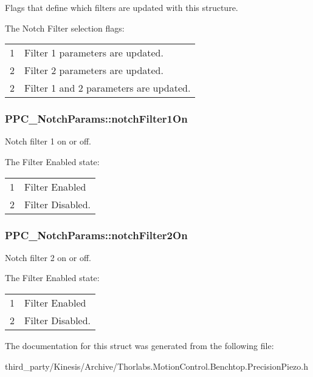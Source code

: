 Flags that define which filters are updated with this structure. 

The Notch Filter selection flags\+: \tabulinesep=1mm
\begin{longtabu} spread 0pt [c]{*2{|X[-1]}|}
&Filter 1 parameters are updated. \\
2&Filter 2 parameters are updated. \\
2&Filter 1 and 2 parameters are updated. \\
\end{longtabu}
\subsubsection[{\texorpdfstring{notch\+Filter1\+On}{notchFilter1On}}]{ P\+P\+C\+\_\+\+Notch\+Params\+::notch\+Filter1\+On}\hypertarget{struct_p_p_c___notch_params_a5f3d080db2c5af2d543e39fc33f1220d}{}\label{struct_p_p_c___notch_params_a5f3d080db2c5af2d543e39fc33f1220d}


Notch filter 1 on or off. 

The Filter Enabled state\+: \tabulinesep=1mm
\begin{longtabu} spread 0pt [c]{*2{|X[-1]}|}
&Filter Enabled \\
2&Filter Disabled. \\
\end{longtabu}
\subsubsection[{\texorpdfstring{notch\+Filter2\+On}{notchFilter2On}}]{ P\+P\+C\+\_\+\+Notch\+Params\+::notch\+Filter2\+On}\hypertarget{struct_p_p_c___notch_params_a6d5d54992092f9013ec109fb99416a91}{}\label{struct_p_p_c___notch_params_a6d5d54992092f9013ec109fb99416a91}


Notch filter 2 on or off. 

The Filter Enabled state\+: \tabulinesep=1mm
\begin{longtabu} spread 0pt [c]{*2{|X[-1]}|}
&Filter Enabled \\
2&Filter Disabled. \\
\end{longtabu}


The documentation for this struct was generated from the following file\+:\begin{DoxyCompactItemize}
\item 
third\+\_\+party/\+Kinesis/\+Archive/Thorlabs.\+Motion\+Control.\+Benchtop.\+Precision\+Piezo.\+h\end{DoxyCompactItemize}
